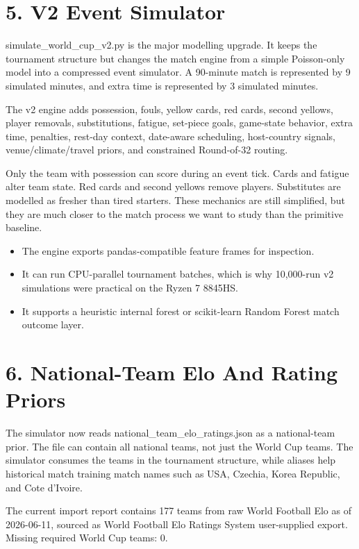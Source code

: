 \documentclass[10pt]{article}
\begin{document}
\section{5. V2 Event Simulator}

simulate\_world\_cup\_v2.py is the major modelling upgrade. It keeps the tournament structure but changes the match engine from a simple Poisson-only model into a compressed event simulator. A 90-minute match is represented by 9 simulated minutes, and extra time is represented by 3 simulated minutes.

The v2 engine adds possession, fouls, yellow cards, red cards, second yellows, player removals, substitutions, fatigue, set-piece goals, game-state behavior, extra time, penalties, rest-day context, date-aware scheduling, host-country signals, venue/climate/travel priors, and constrained Round-of-32 routing.

Only the team with possession can score during an event tick. Cards and fatigue alter team state. Red cards and second yellows remove players. Substitutes are modelled as fresher than tired starters. These mechanics are still simplified, but they are much closer to the match process we want to study than the primitive baseline.

\begin{itemize}
  \item The engine exports pandas-compatible feature frames for inspection.
  \item It can run CPU-parallel tournament batches, which is why 10,000-run v2 simulations were practical on the Ryzen 7 8845HS.
  \item It supports a heuristic internal forest or scikit-learn Random Forest match outcome layer.
\end{itemize}

\section{6. National-Team Elo And Rating Priors}

The simulator now reads national\_team\_elo\_ratings.json as a national-team prior. The file can contain all national teams, not just the World Cup teams. The simulator consumes the teams in the tournament structure, while aliases help historical match training match names such as USA, Czechia, Korea Republic, and Cote d'Ivoire.

The current import report contains 177 teams from raw World Football Elo as of 2026-06-11, sourced as World Football Elo Ratings System user-supplied export. Missing required World Cup teams: 0.
\end{document}
